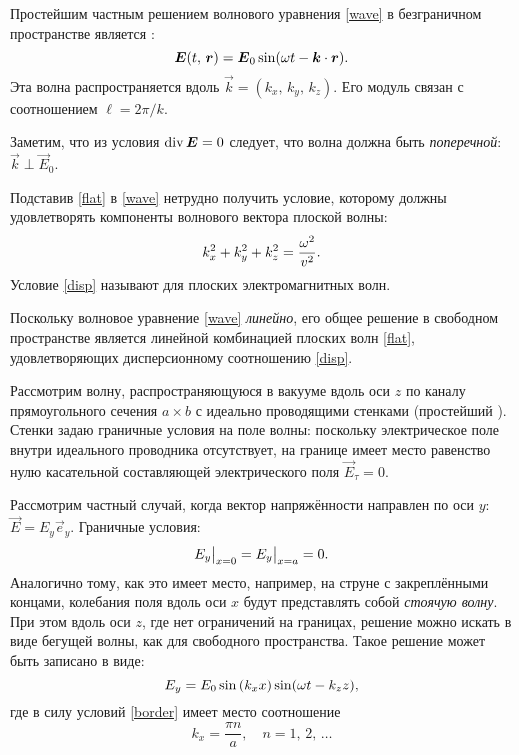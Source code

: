 Простейшим частным решением волнового уравнения \eqref{wave} в безграничном пространстве 
является :
\begin{equation} \eqmark{flat}
\vec{E}(t,\,\vec{r}) = \vec{E}_{0} \sin(\omega t - \vec{k}\cdot\vec{r}).
\end{equation}
Эта волна распространяется вдоль  $\vec{k}=(k_x,\,k_y,\,k_z)$.
Его модуль связан с  соотношением $\ell=2\pi/k$.

Заметим, что из условия $\mathop{\mathrm{div}} {\boldsymbol{E}}=0$ следует, что волна должна быть
\emph{поперечной}: $\vec{k} \perp \vec{E}_0$. 

Подставив \eqref{flat} в
\eqref{wave} нетрудно получить условие, которому должны удовлетворять компоненты
волнового вектора плоской волны:
\begin{equation} \eqmark{disp}
k_x^2 + k_y^2 + k_z^2 = \frac{\omega^2}{v^2}.
\end{equation}
Условие \eqref{disp} называют  для
плоских электромагнитных волн.

Поскольку волновое уравнение \eqref{wave} \emph{линейно}, его общее решение 
в свободном пространстве является линейной комбинацией плоских
волн \eqref{flat}, удовлетворяющих дисперсионному соотношению \eqref{disp}.


Рассмотрим волну, распространяющуюся в вакууме вдоль оси $z$ по каналу 
прямоугольного сечения $a\times b$ с идеально проводящими стенками 
(простейший ).
Стенки задаю граничные условия на поле волны:
поскольку электрическое поле внутри идеального проводника отсутствует,
на границе имеет место равенство нулю касательной составляющей
электрического поля $\vec{E}_{\tau} = 0$. 

Рассмотрим частный случай, когда вектор напряжённости направлен 
по оси $y$: $\vec{E} = E_y \vec{e}_y$. Граничные условия:
\begin{equation} \eqmark{border}
E_y\big|_{x=0} = E_y\big|_{x=a} = 0.
\end{equation}
Аналогично тому, как это имеет место, например, на струне с закреплёнными концами, 
колебания поля вдоль оси $x$ будут представлять собой 
\emph{стоячую волну}. При этом вдоль оси $z$, где нет ограничений на границах,
решение можно искать в виде бегущей волны, как для свободного пространства.
Такое решение может быть записано в виде: 
\begin{equation}
\eqmark{2.0.1} E_y=E_0 \sin\left(k_x x\right)\sin(\omega t-k_z z),
\end{equation} 
где в силу условий \eqref{border} имеет место соотношение
\[
k_x = \frac{\pi n}{a},\quad n=1,\,2,\,\ldots
\]


